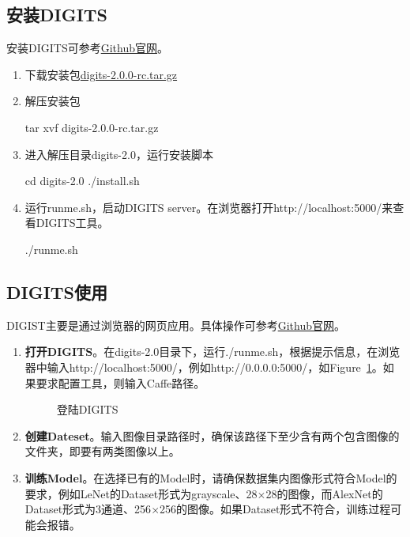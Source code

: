 \subsection{安装DIGITS}
安装DIGITS可参考\href{http://devblogs.nvidia.com/parallelforall/digits-deep-learning-gpu-training-system/}{Github官网}。
\begin{enumerate}
\item 下载安装包\href{https://developer.nvidia.com/digits}{digits-2.0.0-rc.tar.gz}
\item 解压安装包
\begin{bash}
tar xvf digits-2.0.0-rc.tar.gz
\end{bash}
\item 进入解压目录digits-2.0，运行安装脚本
\begin{bash}
cd digits-2.0
./install.sh
\end{bash}
\item 运行runme.sh，启动DIGITS server。在浏览器打开http://localhost:5000/来查看DIGITS工具。
\begin{bash}
./runme.sh
\end{bash}
\end{enumerate}

\subsection{DIGITS使用}
DIGIST主要是通过浏览器的网页应用。具体操作可参考\href{https://github.com/NVIDIA/DIGITS/blob/digits-2.0/docs/GettingStarted.md}{Github官网}。
\begin{enumerate}
\item \textbf{打开DIGITS}。在digits-2.0目录下，运行./runme.sh，根据提示信息，在浏览器中输入http://localhost:5000/，例如http://0.0.0.0:5000/，如Figure~\ref{fig:digits}。如果要求配置工具，则输入Caffe路径。
\begin{figure}[!ht]
  \centering 
  \caption{登陆DIGITS}
  \label{fig:digits}
\end{figure}

\item \textbf{创建Dateset}。输入图像目录路径时，确保该路径下至少含有两个包含图像的文件夹，即要有两类图像以上。

\item \textbf{训练Model}。在选择已有的Model时，请确保数据集内图像形式符合Model的要求，例如LeNet的Dataset形式为grayscale、28$\times$28的图像，而AlexNet的Dataset形式为3通道、256$\times$256的图像。如果Dataset形式不符合，训练过程可能会报错。
\end{enumerate}



